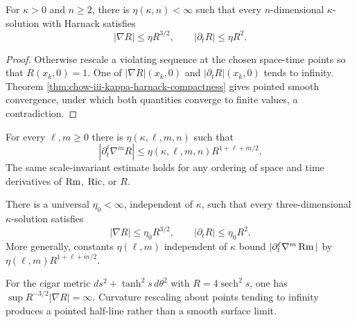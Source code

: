 \begin{theorem}
\label{thm:chow-iii-kappa-scaled-derivative-estimates}
For $\kappa>0$ and $n\ge2$, there is $\eta(\kappa,n)<\infty$ such that every
$n$-dimensional $\kappa$-solution with Harnack satisfies
\[
 |\nabla R|\le\eta R^{3/2},
 \qquad |\partial_tR|\le\eta R^2.
\]
\end{theorem}
\begin{proof}
Otherwise rescale a violating sequence at the chosen space-time points so
that $R(x_k,0)=1$.  One of $|\nabla R|(x_k,0)$ and
$|\partial_tR|(x_k,0)$ tends to infinity.  Theorem
\ref{thm:chow-iii-kappa-harnack-compactness} gives pointed smooth convergence,
under which both quantities converge to finite values, a contradiction.
\end{proof}

\begin{remark}
\label{rem:chow-iii-kappa-all-derivative-estimates}
For every $\ell,m\ge0$ there is $\eta(\kappa,\ell,m,n)$ such that
\[
 |\partial_t^\ell\nabla^mR|
 \le\eta(\kappa,\ell,m,n)R^{1+\ell+m/2}.
\]
The same scale-invariant estimate holds for any ordering of space and time
derivatives of $\operatorname{Rm}$, $\operatorname{Ric}$, or $R$.
\end{remark}

\begin{corollary}
\label{cor:chow-iii-3d-universal-scaled-derivatives}
There is a universal $\eta_0<\infty$, independent of $\kappa$, such that
every three-dimensional $\kappa$-solution satisfies
\[
 |\nabla R|\le\eta_0R^{3/2},
 \qquad |\partial_tR|\le\eta_0R^2.
\]
More generally, constants $\eta(\ell,m)$ independent of $\kappa$ bound
$|\partial_t^\ell\nabla^m\operatorname{Rm}|$ by
$\eta(\ell,m)R^{1+\ell+m/2}$.
\end{corollary}

\begin{remark}
\label{rem:chow-iii-cigar-scaled-derivative-failure}
For the cigar metric $ds^2+\tanh^2s\,d\theta^2$ with
$R=4\operatorname{sech}^2s$, one has
$\sup R^{-3/2}|\nabla R|=\infty$.  Curvature rescaling about points tending
to infinity produces a pointed half-line rather than a smooth surface limit.
\end{remark}

